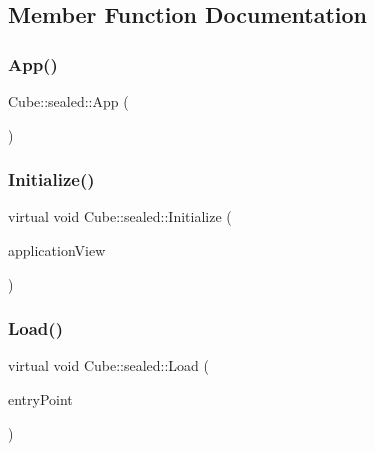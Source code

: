 \subsection{Member Function Documentation}
\mbox{\label{class_cube_1_1sealed_a2921e740241bae7484e2682f90749b4f}} 
\subsubsection{\texorpdfstring{App()}{App()}}
{\footnotesize\ttfamily Cube\+::sealed\+::\+App (\begin{DoxyParamCaption}{ }\end{DoxyParamCaption})}

\mbox{\label{class_cube_1_1sealed_a9558710bf2600718f1ff7cbbcaa6213e}} 
\subsubsection{\texorpdfstring{Initialize()}{Initialize()}}
{\footnotesize\ttfamily virtual void Cube\+::sealed\+::\+Initialize (\begin{DoxyParamCaption}\item[{Windows\+::\+Application\+Model\+::\+Core\+::\+Core\+Application\+View$^\wedge$}]{application\+View }\end{DoxyParamCaption})\hspace{0.3cm}{\ttfamily [virtual]}}

\mbox{\label{class_cube_1_1sealed_a6b0578eb7635f4beda03ff766bf2b043}} 
\subsubsection{\texorpdfstring{Load()}{Load()}}
{\footnotesize\ttfamily virtual void Cube\+::sealed\+::\+Load (\begin{DoxyParamCaption}\item[{Platform\+::\+String$^\wedge$}]{entry\+Point }\end{DoxyParamCaption})\hspace{0.3cm}{\ttfamily [virtual]}}

